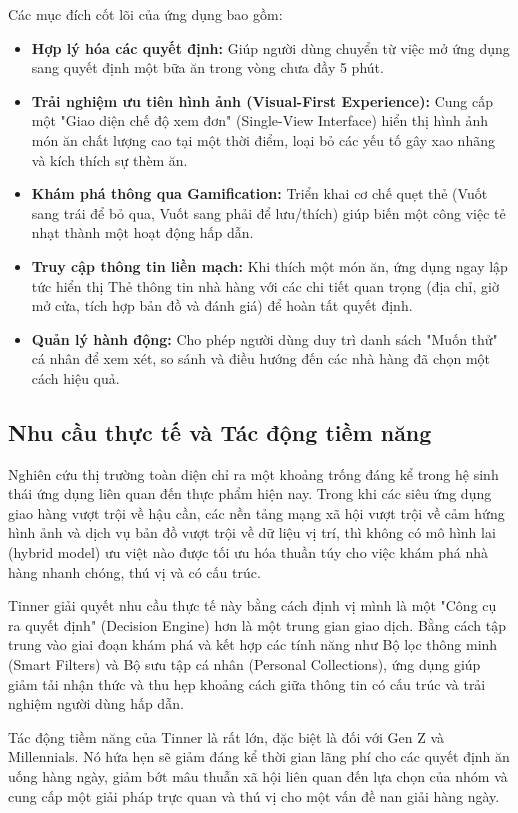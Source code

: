 Các mục đích cốt lõi của ứng dụng bao gồm:
\begin{itemize}
    \item \textbf{Hợp lý hóa các quyết định:} Giúp người dùng chuyển từ việc mở ứng dụng sang quyết định một bữa ăn trong vòng chưa đầy 5 phút.
    \item \textbf{Trải nghiệm ưu tiên hình ảnh (Visual-First Experience):} Cung cấp một "Giao diện chế độ xem đơn" (Single-View Interface) hiển thị hình ảnh món ăn chất lượng cao tại một thời điểm, loại bỏ các yếu tố gây xao nhãng và kích thích sự thèm ăn.
    \item \textbf{Khám phá thông qua Gamification:} Triển khai cơ chế quẹt thẻ (Vuốt sang trái để bỏ qua, Vuốt sang phải để lưu/thích) giúp biến một công việc tẻ nhạt thành một hoạt động hấp dẫn.
    \item \textbf{Truy cập thông tin liền mạch:} Khi thích một món ăn, ứng dụng ngay lập tức hiển thị Thẻ thông tin nhà hàng với các chi tiết quan trọng (địa chỉ, giờ mở cửa, tích hợp bản đồ và đánh giá) để hoàn tất quyết định.
    \item \textbf{Quản lý hành động:} Cho phép người dùng duy trì danh sách "Muốn thử" cá nhân để xem xét, so sánh và điều hướng đến các nhà hàng đã chọn một cách hiệu quả.
\end{itemize}

\subsection{Nhu cầu thực tế và Tác động tiềm năng}
Nghiên cứu thị trường toàn diện chỉ ra một khoảng trống đáng kể trong hệ sinh thái ứng dụng liên quan đến thực phẩm hiện nay. Trong khi các siêu ứng dụng giao hàng vượt trội về hậu cần, các nền tảng mạng xã hội vượt trội về cảm hứng hình ảnh và dịch vụ bản đồ vượt trội về dữ liệu vị trí, thì không có mô hình lai (hybrid model) ưu việt nào được tối ưu hóa thuần túy cho việc khám phá nhà hàng nhanh chóng, thú vị và có cấu trúc.

Tinner giải quyết nhu cầu thực tế này bằng cách định vị mình là một "Công cụ ra quyết định" (Decision Engine) hơn là một trung gian giao dịch. Bằng cách tập trung vào giai đoạn khám phá và kết hợp các tính năng như Bộ lọc thông minh (Smart Filters) và Bộ sưu tập cá nhân (Personal Collections), ứng dụng giúp giảm tải nhận thức và thu hẹp khoảng cách giữa thông tin có cấu trúc và trải nghiệm người dùng hấp dẫn.

Tác động tiềm năng của Tinner là rất lớn, đặc biệt là đối với Gen Z và Millennials. Nó hứa hẹn sẽ giảm đáng kể thời gian lãng phí cho các quyết định ăn uống hàng ngày, giảm bớt mâu thuẫn xã hội liên quan đến lựa chọn của nhóm và cung cấp một giải pháp trực quan và thú vị cho một vấn đề nan giải hàng ngày.
